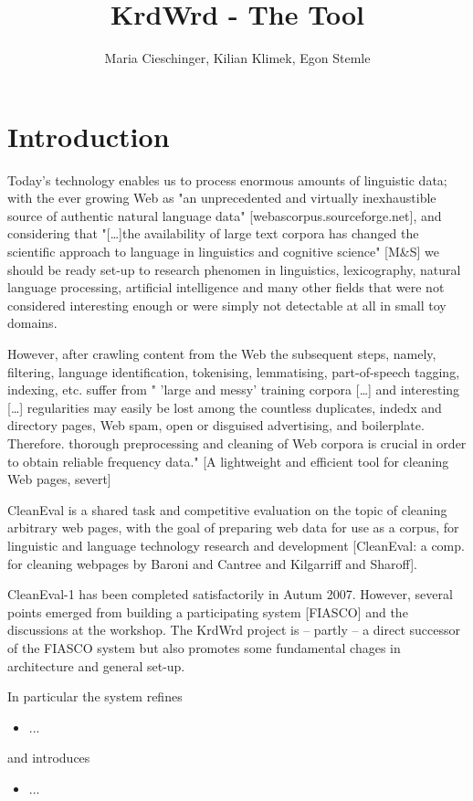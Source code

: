 \documentclass[12pt]{article}
\title{KrdWrd - The Tool}
\author{Maria Cieschinger, Kilian Klimek, Egon Stemle}
\begin{document}
\maketitle

\section{Introduction}
Today's technology enables us to process enormous amounts of linguistic data; with the ever growing Web as "an unprecedented and virtually inexhaustible source of authentic natural language data" [webascorpus.sourceforge.net], and considering that "[\ldots]the availability of large text corpora has changed the scientific approach to language in linguistics and cognitive science" [M\&S] we should be ready set-up to research phenomen in linguistics, lexicography, natural language processing, artificial intelligence and many other fields that were not considered interesting enough or were simply not detectable at all in small toy domains.

However, after crawling content from the Web the subsequent steps, namely, filtering, language identification, tokenising, lemmatising, part-of-speech tagging, indexing, etc. suffer from " 'large and messy' training corpora [\ldots] and interesting [\ldots] regularities may easily be lost among the countless duplicates, indedx and directory pages, Web spam, open or disguised advertising, and boilerplate. Therefore. thorough preprocessing and cleaning of Web corpora is crucial in order to obtain reliable frequency data." [A lightweight and efficient tool for cleaning Web pages, severt]

CleanEval is a shared task and competitive evaluation on the topic of cleaning arbitrary web pages, with the goal of preparing web data for use as a corpus, for linguistic and language technology research and development [CleanEval: a comp. for cleaning webpages by Baroni and Cantree and Kilgarriff and Sharoff].

CleanEval-1 has been completed satisfactorily in Autum 2007. However, several points emerged from building a participating system [FIASCO] and the discussions at the workshop. The KrdWrd project is -- partly -- a direct successor of the FIASCO system but also promotes some fundamental chages in architecture and general set-up.

In particular the system refines
\begin{itemize}
	\item ...
\end{itemize}    
and introduces
\begin{itemize}
	\item ...
\end{itemize}
\end{document}
